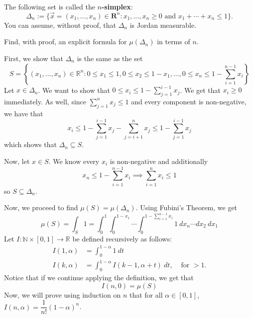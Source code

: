 \documentclass{article}
\newcommand{\R}{\mathbf{R}}
\theoremstyle{plain} %
\numberwithin{thm}{section} %
\theoremstyle{definition}
\begin{document}
    \begin{question}{37}
        The following set is called the \textbf{$n$-simplex}:
        \[ \Delta_n := \{ \vec{x}=(x_1,\ldots,x_n)\in \R^n : x_1,\ldots,x_n\geq 0 \text{ and } x_1+\cdots+x_n\leq 1\}. \]
        You can assume, without proof, that $\Delta_n$ is Jordan measurable.
        
        Find, with proof, an explicit formula for $\mu(\Delta_n)$ in terms of $n$.

        \tcblower

        First, we show that \(\Delta _n\) is the same as the set
        \[
            S = \left\{ (x_1, ..., x_n) \in \mathbb{R}^n : 0\leq x_1 \leq 1, 0 \leq x_2 \leq 1 - x_1, ..., 0 \leq x_n \leq 1 - \sum_{i=1}^{n-1} x_i \right\}
        \]
        Let \(x \in \Delta _n\). We want to show that \(0 \leq x_i \leq 1 - \sum_{j=1}^{i - 1} x_j\). We get that \(x_i \geq 0\) immediately. As well, since \(\sum_{j=1}^{n} x_j \leq 1\) and every component is non-negative, we have that
        \[
            x_i \leq 1 - \sum_{j=1}^{i - 1} x_j - \sum_{j=i+1}^{n} x_j \leq 1 - \sum_{j=1}^{i - 1} x_j
        \]
        which shows that \(\Delta _n \subseteq S\).

        Now, let \(x \in S\). We know every \(x_i\) is non-negative and additionally
        \[
            x_n \leq 1 - \sum_{i=1}^{n-1} x_i \implies \sum_{i=1}^{n} x_i \leq 1
        \]
        so \(S \subseteq \Delta _n\).

        Now, we proceed to find \(\mu (S) = \mu (\Delta _n)\). Using Fubini's Theorem, we get
        \[
            \mu (S) = \int _S 1 = \int _0^1 \int _0^{1-x_1} \cdots \int _0^{1 - \sum_{i=1}^{n-1} x_i} 1\ dx_n \cdots dx_2\ dx_1
        \]
        Let \(I: \mathbb{N} \times [0,1] \to \mathbb{R}\) be defined recursively as follows:
        \begin{align*}
            I(1, \alpha) &= \int _0^{1-\alpha} 1\ dt &\ \\
            I(k, \alpha) &= \int _0^{1-\alpha} I(k-1, \alpha + t)\ dt, &\text{ for } > 1.
        \end{align*}
        Notice that if we continue applying the definition, we get that
        \[
            I(n, 0) = \mu (S)
        \]
        Now, we will prove using induction on \(n\) that for all \(\alpha \in [0,1]\), \(I(n, \alpha) = \dfrac{1}{n!}(1 - \alpha)^n\).


\end{question}
\end{document}
